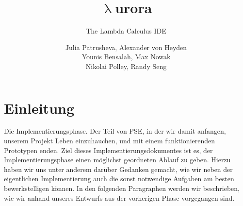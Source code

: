 \documentclass[parskip=full,11pt,twoside]{scrartcl}
\title{\textbf{$\uplambda$}urora}
\subtitle{The Lambda Calculus IDE}
\author{Julia Patrusheva, Alexander von Heyden\\
Younis Bensalah, Max Nowak\\
Nikolai Polley, Randy Seng}
\begin{document}
\maketitle
\tableofcontents
\newpage
\section{Einleitung}
Die Implementierungsphase.
Der Teil von PSE, in der wir damit anfangen, unserem Projekt Leben einzuhauchen, und mit einem funktionierenden Prototypen enden.
\newline
Ziel dieses Implementierungsdokumentes ist es, der Implementierungsphase einen möglichst geordneten Ablauf zu geben.
Hierzu haben wir uns unter anderem darüber Gedanken gemacht, wie wir neben der eigentlichen Implementierung auch die sonst notwendige Aufgaben am besten bewerkstelligen können.
In den folgenden Paragraphen werden wir beschrieben, wie wir anhand unseres Entwurfs aus der vorherigen Phase vorgegangen sind.
\newline
\newpage

\end{document}
